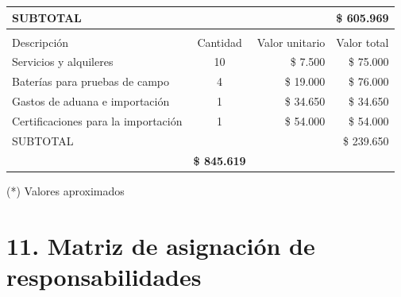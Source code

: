 \documentclass[11pt]{charter}
\begin{document}
\begin{table}[H]
\begin{tabularx}{\linewidth}{@{}|X|c|r|r|@{}}

      
  \multicolumn{3}{|l|}{SUBTOTAL} &
  \multicolumn{1}{r|}{\$ 605.969} \\ \hline
  
  \rowcolor[HTML]{C0C0C0} 
  \multicolumn{4}{|c|}{\cellcolor[HTML]{C0C0C0}\textbf{COSTOS INDIRECTOS}} \\ \hline
  \rowcolor[HTML]{C0C0C0} 
  Descripción &
  \multicolumn{1}{c|}{\cellcolor[HTML]{C0C0C0}Cantidad} &
  \multicolumn{1}{c|}{\cellcolor[HTML]{C0C0C0}Valor unitario} &
  \multicolumn{1}{c|}{\cellcolor[HTML]{C0C0C0}Valor total} \\ \hline

  \multicolumn{1}{|l|}{Servicios y alquileres} & 10
  & \$ 7.500
  & \$ 75.000
  \\ \hline

  \multicolumn{1}{|l|}{Baterías para pruebas de campo} & 4
  & \$ 19.000
  & \$ 76.000
  \\ \hline
   
  \multicolumn{1}{|l|}{Gastos de aduana e importación} & 1
  & \$ 34.650
  & \$ 34.650 \\ \hline
   
  \multicolumn{1}{|l|}{Certificaciones para la importación} & 1
  & \$ 54.000
  & \$ 54.000 \\ \hline    
   
  \multicolumn{3}{|l|}{SUBTOTAL} &
  \multicolumn{1}{r|}{\$ 239.650} \\ \hline
  \rowcolor[HTML]{C0C0C0}
  \multicolumn{3}{|r|}{\textbf{TOTAL}} & \textbf{\$ 845.619}
  \\ \hline
  
 \end{tabularx}
\end{table}

(*) Valores aproximados


\section{11. Matriz de asignación de responsabilidades}
\label{sec:responsabilidades}
\end{document}
